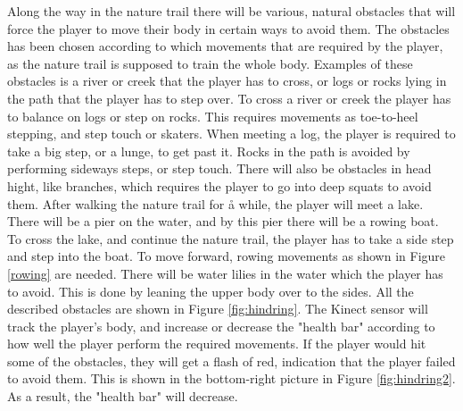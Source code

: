 Along the way in the nature trail there will be various, natural obstacles that will force the player to move their body in certain ways to avoid them. The obstacles has been chosen according to which movements that are required by the player, as the nature trail is supposed to train the whole body. Examples of these obstacles is a river or creek that the player has to cross, or logs or rocks lying in the path that the player has to step over. To cross a river or creek the player has to balance on logs or step on rocks. This requires movements as toe-to-heel stepping, and step touch or skaters. When meeting a log, the player is required to take a big step, or a lunge, to get past it. Rocks in the path is avoided by performing sideways steps, or step touch. There will also be obstacles in head hight, like branches, which requires the player to go into deep squats to avoid them. After walking the nature trail for å while, the player will meet a lake. There will be a pier on the water, and by this pier there will be a rowing boat. To cross the lake, and continue the nature trail, the player has to take a side step and step into the boat. To move forward, rowing movements as shown in Figure \ref{rowing} are needed. There will be water lilies in the water which the player has to avoid. This is done by leaning the upper body over to the sides. All the described obstacles are shown in Figure \ref{fig:hindring}. The Kinect sensor will track the player's body, and increase or decrease the "health bar" according to how well the player perform the required movements. If the player would hit some of the obstacles, they will get a flash of red, indication that the player failed to avoid them. This is shown in the bottom-right picture in Figure \ref{fig:hindring2}. As a result, the "health bar" will decrease.     


